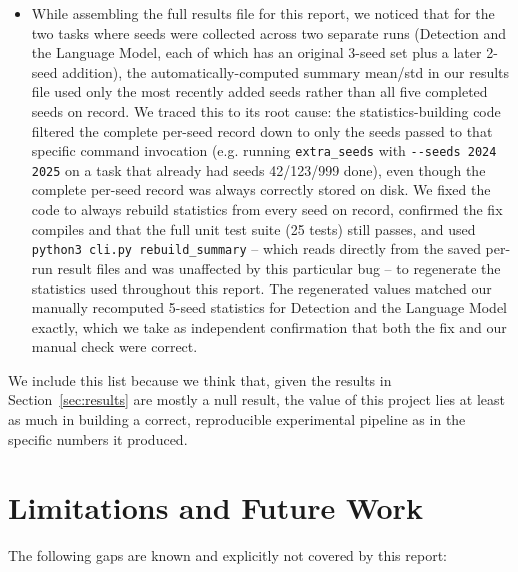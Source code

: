 \documentclass[conference]{IEEEtran}
\begin{document}
\begin{itemize}
\item While assembling the full results file for this report, we noticed that for the two tasks where seeds were collected across two separate runs (Detection and the Language Model, each of which has an original 3-seed set plus a later 2-seed addition), the automatically-computed summary mean/std in our results file used only the most recently added seeds rather than all five completed seeds on record. We traced this to its root cause: the statistics-building code filtered the complete per-seed record down to only the seeds passed to that specific command invocation (e.g. running \texttt{extra\_seeds} with \texttt{-{}-seeds 2024 2025} on a task that already had seeds 42/123/999 done), even though the complete per-seed record was always correctly stored on disk. We fixed the code to always rebuild statistics from every seed on record, confirmed the fix compiles and that the full unit test suite (25 tests) still passes, and used \texttt{python3 cli.py rebuild\_summary} -- which reads directly from the saved per-run result files and was unaffected by this particular bug -- to regenerate the statistics used throughout this report. The regenerated values matched our manually recomputed 5-seed statistics for Detection and the Language Model exactly, which we take as independent confirmation that both the fix and our manual check were correct.
\end{itemize}

We include this list because we think that, given the results in Section~\ref{sec:results} are mostly a null result, the value of this project lies at least as much in building a correct, reproducible experimental pipeline as in the specific numbers it produced.

\section{Limitations and Future Work}
\label{sec:limitations}

The following gaps are known and explicitly not covered by this report:
\end{document}
